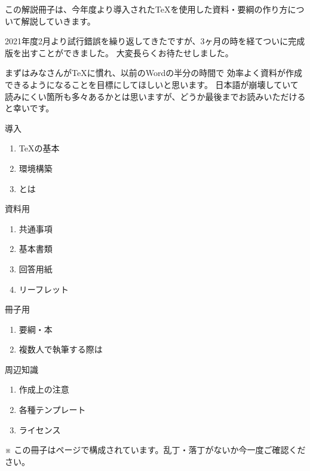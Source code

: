 \pagestyle{empty}

\begin{multicols*}{2}
\setlength{\columnseprule}{0pt}
この解説冊子は、今年度より導入された\TeX を使用した資料・要綱の作り方について解説していきます。

2021年度2月より試行錯誤を繰り返してきた\BunTeX ですが、3ヶ月の時を経てついに完成版を出すことができました。
大変長らくお待たせしました。

まずはみなさんが\TeX に慣れ、以前のWordの半分の時間で
効率よく資料が作成できるようになることを目標にしてほしいと思います。
日本語が崩壊していて読みにくい箇所も多々あるかとは思いますが、どうか最後までお読みいただけると幸いです。


\begin{enumsquare}
    \setlength{\leftskip}{-0.7\zw}
    \item 導入
    \begin{enumerate}
        \renewcommand{\labelenumii}{\hspace{4\zw}□~\ajKakko{\arabic{enumii}}　}
        \item \TeX の基本
        \item 環境構築
        \item \BunTeX とは
    \end{enumerate}
    \item 資料用\BunTeX
    \begin{enumerate}
        \renewcommand{\labelenumii}{\hspace{4\zw}□~\ajKakko{\arabic{enumii}}　}
        \item 共通事項
        \item 基本書類
        \item 回答用紙
        \item リーフレット
    \end{enumerate}
    \item 冊子用\BunTeX
    \begin{enumerate}
        \renewcommand{\labelenumii}{\hspace{4\zw}□~\ajKakko{\arabic{enumii}}　}
        \item 要綱・本
        \item 複数人で執筆する際は
    \end{enumerate}
    \item 周辺知識
    \begin{enumerate}
        \renewcommand{\labelenumii}{\hspace{4\zw}□~\ajKakko{\arabic{enumii}}　}
        \item 作成上の注意
        \item 各種テンプレート
        \item ライセンス
    \end{enumerate}
\end{enumsquare}
\noindent ※ この冊子は\lastpage ページで構成されています。乱丁・落丁がないか今一度ご確認ください。


\end{multicols*}

